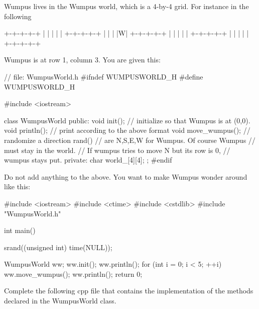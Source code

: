 \nextq
Wumpus lives in the Wumpus world, which is a 4-by-4 grid.
For instance in the following
\begin{console}[frame=single,fontsize=\footnotesize]
+-+-+-+-+
| | | | |
+-+-+-+-+
| | | |W|
+-+-+-+-+
| | | | |
+-+-+-+-+
| | | | |
+-+-+-+-+
\end{console}
Wumpus is at row 1, column 3.
You are given this:
\begin{console}[frame=single,fontsize=\footnotesize]
// file: WumpusWorld.h
#ifndef WUMPUSWORLD_H
#define WUMPUSWORLD_H

#include <iostream>

class WumpusWorld
{
public:
    void init();         // initialize so that Wumpus is at (0,0).
    void println();      // print according to the above format
    void move_wumpus();  // randomize a direction rand() %
                         // are N,S,E,W for Wumpus. Of course Wumpus
                         // must stay in the world.
                         // If wumpus tries to move N but its row is 0,
                         // wumpus stays put.
private:
    char world_[4][4];
};
#endif
\end{console}
Do not add anything to the above.
You want to make Wumpus wonder around like this:
\begin{console}[frame=single,fontsize=\footnotesize]
#include <iostream>
#include <ctime>
#include <cstdlib>
#include "WumpusWorld.h"

int main()
{
    srand((unsigned int) time(NULL));

    WumpusWorld ww;
    ww.init();
    ww.println();
    for (int i = 0; i < 5; ++i)
    {
        ww.move_wumpus();
        ww.println();
    }
    return 0;
}
\end{console}
Complete the following cpp file that contains the implementation
of the methods declared in the WumpusWorld class.
\\
\ANSWER
